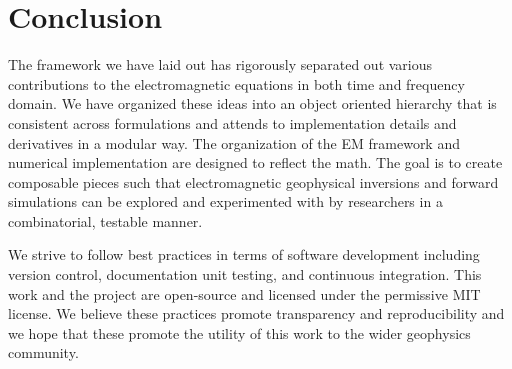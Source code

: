 \section{Conclusion}
\label{sec:Conclusion}

The framework we have laid out has rigorously separated out various
contributions to the electromagnetic equations in both time and frequency domain.
We have organized these ideas into an object oriented hierarchy
that is consistent across formulations and attends to
implementation details and derivatives in a modular way.
The organization of the EM framework and numerical implementation are designed to reflect the math.
The goal is to create composable pieces such that electromagnetic
geophysical inversions and forward simulations can be explored and experimented
with by researchers in a combinatorial, testable manner.

We strive to follow best practices in terms of software development including
version control, documentation unit testing, and continuous integration. This work
and the \SimPEG project are open-source and licensed under the permissive MIT
license. We believe these practices promote transparency and reproducibility and we hope
that these promote the utility of this work to the wider geophysics community.
